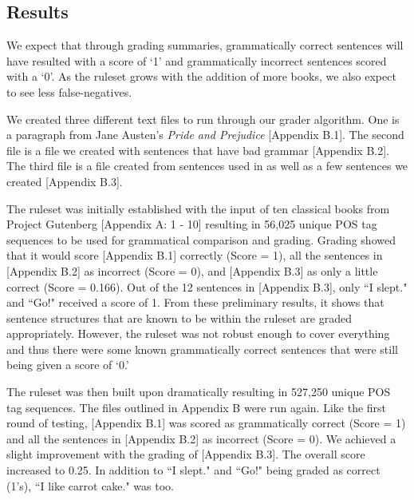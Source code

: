 \documentclass[11pt,a4paper]{article}
\begin{document}
\begin{multicols}{2}
  

\section{Results}
We expect that through grading summaries, grammatically correct sentences will have resulted with a score of `1' and grammatically incorrect sentences scored with a `0'. As the ruleset grows with the addition of more books, we also expect to see less false-negatives. 

We created three different text files to run through our grader algorithm. One is a paragraph from Jane Austen's \textit{Pride and Prejudice} [Appendix B.1]. The second file is a file we created with sentences that have bad grammar [Appendix B.2]. The third file is a file created from sentences used in \cite{li2014} as well as a few sentences we created [Appendix B.3].

The ruleset was initially established with the input of ten classical books from Project Gutenberg [Appendix A: 1 - 10] resulting in 56,025 unique POS tag sequences to be used for grammatical comparison and grading. Grading showed that it would score [Appendix B.1] correctly (Score = 1), all the sentences in [Appendix B.2] as incorrect (Score = 0), and [Appendix B.3] as only a little correct (Score = 0.166).  Out of the 12 sentences in [Appendix B.3], only ``I slept." and ``Go!" received a score of 1. From these preliminary results, it shows that sentence structures that are known to be within the ruleset are graded appropriately. However, the ruleset was not robust enough to cover everything and thus there were some known grammatically correct sentences that were still being given a score of `0.'

The ruleset was then built upon dramatically resulting in 527,250 unique POS tag sequences. The files outlined in Appendix B were run again. Like the first round of testing, [Appendix B.1] was scored as grammatically correct (Score = 1) and all the sentences in [Appendix B.2] as incorrect (Score = 0). We achieved a slight improvement with the grading of [Appendix B.3]. The overall score increased to 0.25. In addition to ``I slept." and ``Go!" being graded as correct (1's), ``I like carrot cake." was too. 



\end{multicols}
\end{document}
